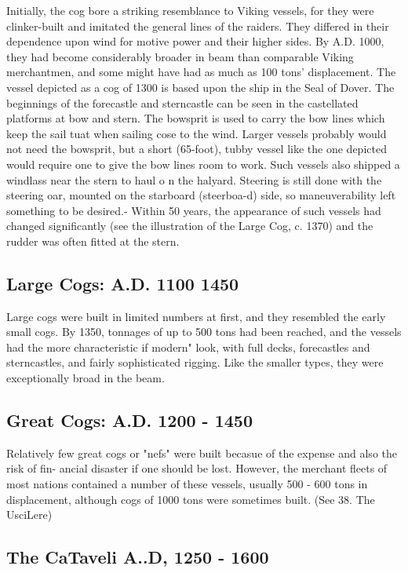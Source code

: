 \documentclass{article}
\begin{document}
\begin{multicols}{3}
Initially, the cog bore a striking resemblance to Viking vessels, for
they were clinker-built and imitated the general lines of the raiders.
They differed in their dependence upon wind for motive power and their
higher sides.  By A.D. 1000, they had become considerably broader in
beam than comparable Viking merchantmen, and some might have had as
much as 100 tons' displacement.  The vessel depicted as a cog of 1300
is based upon the ship in the Seal of Dover.  The beginnings of the
forecastle and sterncastle can be seen in the castellated platforms at
bow and stern.  The bowsprit is used to carry the bow lines which keep
the sail tuat when sailing cose to the wind.  Larger vessels probably
would not need the bowsprit, but a short (65-foot), tubby vessel like
the one depicted would require one to give the bow lines room to work.
Such vessels also shipped a windlass near the stern to haul o n the
halyard.  Steering is still done with the steering oar, mounted on the
starboard (steerboa-d) side, so maneuverability left something to be
desired.- Within 50 years, the appearance of such vessels had changed
significantly (see the illustration of the Large Cog, c. 1370) and the
rudder was often fitted at the stern.

\subsection{Large Cogs:  A.D. 1100   1450}

Large cogs were built in limited numbers at first, and they resembled
the early small cogs.  By 1350, tonnages of up to 500 tons had been
reached, and the vessels had the more characteristic if modern" look,
with full decks, forecastles and sterncastles, and fairly
sophisticated rigging.  Like the smaller types, they were
exceptionally broad in the beam.

\subsection{Great Cogs:  A.D. 1200 - 1450}

Relatively few great cogs or "nefs" were built becasue of the expense
and also the risk of fin- ancial disaster if one should be lost.
However, the merchant fleets of most nations contained a number of
these vessels, usually 500 - 600 tons in displacement, although cogs
of 1000 tons were sometimes built.  (See 38.  The UsciLere)

\subsection{The CaTaveli  A..D, 1250 - 1600}


\end{multicols}
\end{document}
